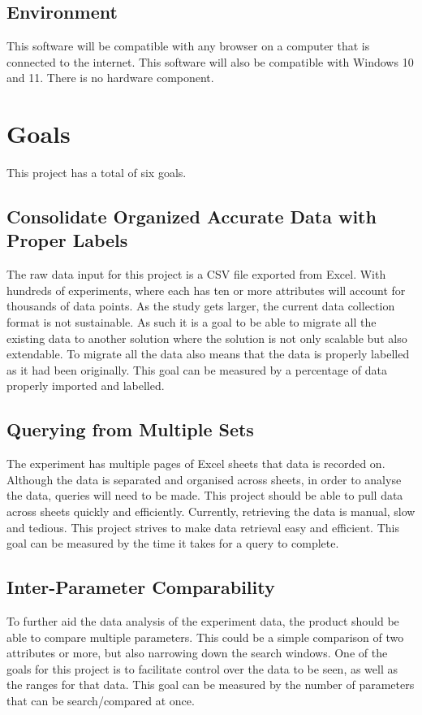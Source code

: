 \documentclass{article}
\begin{document}
\subsection{Environment}
This software will be compatible with any browser on a computer that is
connected to the internet. This software will also be compatible with Windows 10
and 11. There is no hardware component.


\section{Goals}
This project has a total of six goals.
\subsection*{Consolidate Organized Accurate Data with Proper Labels}
The raw data input for this project is a CSV file exported from Excel. With
hundreds of experiments, where each has ten or more attributes will account for
thousands of data points. As the study gets larger, the current data collection
format is not sustainable. As such it is a goal to be able to migrate all the
existing data to another solution where the solution is not only scalable but
also extendable. To migrate all the data also means that the data is properly
labelled as it had been originally. This goal can be measured by a percentage of
data properly imported and labelled.

\subsection*{Querying from Multiple Sets}
The experiment has multiple pages of Excel sheets that data is recorded on.
Although the data is separated and organised across sheets, in order to analyse
the data, queries will need to be made. This project should be able to pull data
across sheets quickly and efficiently. Currently, retrieving the data is manual,
slow and tedious. This project strives to make data retrieval easy and
efficient. This goal can be measured by the time it takes for a query to
complete.  

\subsection*{Inter-Parameter Comparability}
To further aid the data analysis of the experiment data, the product should be
able to compare multiple parameters. This could be a simple comparison of two
attributes or more, but also narrowing down the search windows.  One of the
goals for this project is to facilitate control over the data to be seen, as
well as the ranges for that data. This goal can be measured by the number of
parameters that can be search/compared at once.
\end{document}
